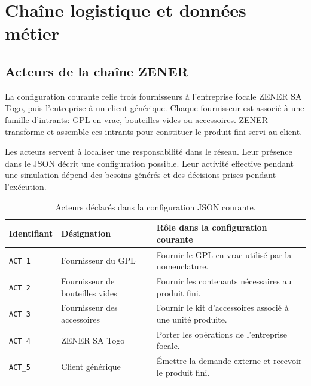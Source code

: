 \chapter{Chaîne logistique et données métier}
\label{chap:chaine-donnees}

\section{Acteurs de la chaîne ZENER}

La configuration courante relie trois fournisseurs à l'entreprise focale ZENER SA Togo, puis l'entreprise à un client générique. Chaque fournisseur est associé à une famille d'intrants: GPL en vrac, bouteilles vides ou accessoires. ZENER transforme et assemble ces intrants pour constituer le produit fini servi au client.


Les acteurs servent à localiser une responsabilité dans le réseau. Leur présence dans le JSON décrit une configuration possible. Leur activité effective pendant une simulation dépend des besoins générés et des décisions prises pendant l'exécution.

\begin{table}[H]
  \centering
  \begin{tabularx}{\textwidth}{L{0.20\textwidth} L{0.27\textwidth} Y}
    \toprule
    Identifiant & Désignation & Rôle dans la configuration courante \\
    \midrule
    \texttt{ACT\_1} & Fournisseur du GPL & Fournir le GPL en vrac utilisé par la nomenclature. \\
    \texttt{ACT\_2} & Fournisseur de bouteilles vides & Fournir les contenants nécessaires au produit fini. \\
    \texttt{ACT\_3} & Fournisseur des accessoires & Fournir le kit d'accessoires associé à une unité produite. \\
    \texttt{ACT\_4} & ZENER SA Togo & Porter les opérations de l'entreprise focale. \\
    \texttt{ACT\_5} & Client générique & Émettre la demande externe et recevoir le produit fini. \\
    \bottomrule
  \end{tabularx}
  \caption{Acteurs déclarés dans la configuration JSON courante.}
  \label{tab:acteurs-configuration}
\end{table}

